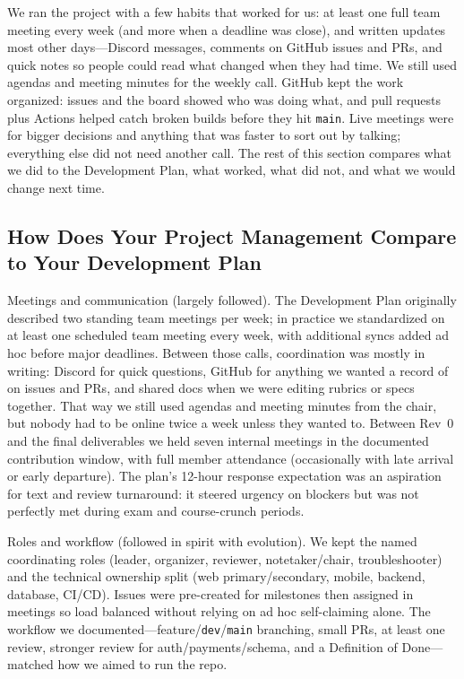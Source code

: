 \documentclass{article}
\begin{document}
We ran the project with a few habits that worked for us: at least one
full team meeting every week (and more when a deadline was close), and
written updates most other days---Discord messages, comments on GitHub
issues and PRs, and quick notes so people could read what changed when they had
time. We still used agendas and meeting minutes for the weekly call. GitHub kept
the work organized: issues and the board showed who was doing what, and pull
requests plus Actions helped catch broken builds before they hit \texttt{main}.
Live meetings were for bigger decisions and anything that was faster to sort out
by talking; everything else did not need another call. The rest of this section
compares what we did to the Development Plan, what worked, what did not, and
what we would change next time.

\subsection{How Does Your Project Management Compare to Your Development Plan}

Meetings and communication (largely followed). The Development Plan
originally described two standing team meetings per week; in practice
we standardized on at least one scheduled team meeting every week,
with additional syncs added ad hoc before major deadlines. Between
those calls, coordination was mostly in writing: Discord for quick
questions, GitHub for anything we wanted a record of on issues and PRs, and
shared docs when we were editing rubrics or specs together. That way we still
used agendas and meeting minutes from the chair, but nobody had
to be online twice a week unless they wanted to.
Between Rev~0 and the final deliverables we held seven internal
meetings in the documented contribution window, with full member
attendance (occasionally with late arrival or early departure). The plan's
12-hour response expectation was an aspiration for text and review
turnaround: it steered urgency on blockers but was not perfectly met during
exam and course-crunch periods.

Roles and workflow (followed in spirit with evolution). We kept the
named coordinating roles (leader, organizer, reviewer, notetaker/chair,
troubleshooter) and the technical ownership split (web primary/secondary,
mobile, backend, database, CI/CD). Issues were pre-created for milestones
then assigned in meetings so load balanced without relying on ad hoc
self-claiming alone. The workflow we documented---feature/\texttt{dev}/\texttt{main} branching,
small PRs, at least one review, stronger review for auth/payments/schema, and
a Definition of Done---matched how we aimed to run the repo.
\end{document}

